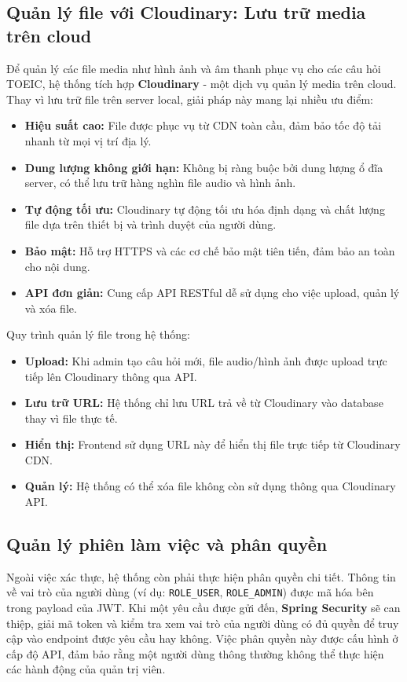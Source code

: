 \documentclass[../DoAn.tex]{subfiles}
\begin{document}
\subsection{Quản lý file với Cloudinary: Lưu trữ media trên cloud}

Để quản lý các file media như hình ảnh và âm thanh phục vụ cho các câu hỏi TOEIC, hệ thống tích hợp \textbf{Cloudinary} - một dịch vụ quản lý media trên cloud. Thay vì lưu trữ file trên server local, giải pháp này mang lại nhiều ưu điểm:

\begin{itemize}
    \item \textbf{Hiệu suất cao:} File được phục vụ từ CDN toàn cầu, đảm bảo tốc độ tải nhanh từ mọi vị trí địa lý.
    \item \textbf{Dung lượng không giới hạn:} Không bị ràng buộc bởi dung lượng ổ đĩa server, có thể lưu trữ hàng nghìn file audio và hình ảnh.
    \item \textbf{Tự động tối ưu:} Cloudinary tự động tối ưu hóa định dạng và chất lượng file dựa trên thiết bị và trình duyệt của người dùng.
    \item \textbf{Bảo mật:} Hỗ trợ HTTPS và các cơ chế bảo mật tiên tiến, đảm bảo an toàn cho nội dung.
    \item \textbf{API đơn giản:} Cung cấp API RESTful dễ sử dụng cho việc upload, quản lý và xóa file.
\end{itemize}

Quy trình quản lý file trong hệ thống:
\begin{itemize}
    \item \textbf{Upload:} Khi admin tạo câu hỏi mới, file audio/hình ảnh được upload trực tiếp lên Cloudinary thông qua API.
    \item \textbf{Lưu trữ URL:} Hệ thống chỉ lưu URL trả về từ Cloudinary vào database thay vì file thực tế.
    \item \textbf{Hiển thị:} Frontend sử dụng URL này để hiển thị file trực tiếp từ Cloudinary CDN.
    \item \textbf{Quản lý:} Hệ thống có thể xóa file không còn sử dụng thông qua Cloudinary API.
\end{itemize}

\subsection{Quản lý phiên làm việc và phân quyền}

Ngoài việc xác thực, hệ thống còn phải thực hiện phân quyền chi tiết. Thông tin về vai trò của người dùng (ví dụ: \texttt{ROLE\_USER}, \texttt{ROLE\_ADMIN}) được mã hóa bên trong payload của JWT. Khi một yêu cầu được gửi đến, \textbf{Spring Security} sẽ can thiệp, giải mã token và kiểm tra xem vai trò của người dùng có đủ quyền để truy cập vào endpoint được yêu cầu hay không. Việc phân quyền này được cấu hình ở cấp độ API, đảm bảo rằng một người dùng thông thường không thể thực hiện các hành động của quản trị viên.
\end{document}
